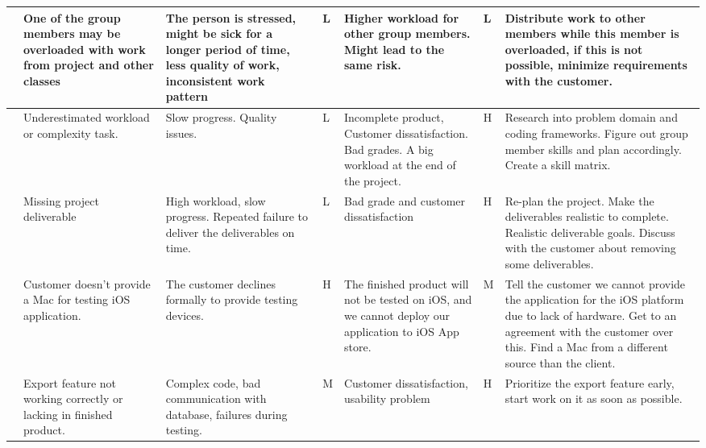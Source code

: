 \begin{landscape}
\begin{longtable}{| p{0.4cm} | p{4cm} | p{4cm} | p{2cm} | p{4cm} | p{1cm} | p{4cm} |}
	\stepcounter{riskId}
	\centering
		\arabic{riskId} &
		One of the group members may be overloaded with work from project and other
		classes &
		The person is stressed, might be sick for a longer period of time, less
		quality of work, inconsistent work pattern &
		\centering L &
		Higher workload for other group members. Might lead to the same risk. &
		\centering  L & Distribute work to other members while this member is
		overloaded, if this is not possible, minimize requirements with the
		customer. \\
	\hline

	\stepcounter{riskId}
	\centering
		\arabic{riskId} &
        Underestimated workload or complexity task. &
		Slow progress. Quality issues. &
		\centering  L &
		Incomplete product, Customer dissatisfaction. Bad grades. A big
		workload at the end of the project. &
		\centering  H &
		Research into problem domain and coding frameworks. Figure out
		group member skills and plan accordingly. Create a skill matrix. \\
	\hline

	\stepcounter{riskId}
	\centering
		\arabic{riskId} &
        Missing project deliverable &
		High workload, slow progress. Repeated failure to deliver the
		deliverables on time. &
		\centering  L &
		Bad grade and customer dissatisfaction &
		\centering H &
		Re-plan the project. Make the deliverables realistic to complete.
		Realistic deliverable goals. Discuss with the customer about removing
		some deliverables. \\
	\hline

	\stepcounter{riskId}
	\centering
		\arabic{riskId} &
        Customer doesn’t provide a Mac for testing iOS application. &
        The customer declines formally to provide testing devices.
		& \centering H &
		The finished product will not be tested on iOS, and we cannot deploy
		our application to iOS App store. &

		\centering  M &
		Tell the customer we cannot provide the application for the iOS
		platform due to lack of hardware. Get to an agreement with the customer
		over this. Find a Mac from a different source than the client. \\
	\hline

	\stepcounter{riskId}
	\centering
		\arabic{riskId} &
		Export feature not working correctly or lacking in finished product. &
		Complex code, bad communication with database, failures during
		testing. &
		\centering  M &
		Customer dissatisfaction, usability problem &
		\centering H &
		Prioritize the export feature early, start work on it as soon as
		possible. \\
	\hline


\end{longtable}
\end{landscape}
